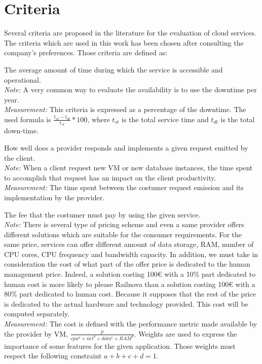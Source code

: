 \documentclass[a4paper,11pt]{article}
\begin{document}
\section{Criteria}
Several criteria are proposed in the literature for the evaluation of cloud services. The criteria which are used in this work has been chosen after consulting the company's preferences.
Those criteria are defined as:
\begin{description}[parsep=1pt,listparindent=\parindent,labelindent=\parindent,font=$\bullet$\ ]
  \item[Availability:] The average amount of time during which the service is accessible and operational.\\
    \emph{Note:} A very common way to evaluate the availability is to use the downtime per year.\\
    \emph{Measurement:} This criteria is expressed as a percentage of the downtime. The used formula is $\frac{t_{st}-t_{dt}}{t_{st}}*100$, where $t_{st}$ is the total service time and $t_{dt}$ is the total down-time.

  \item[Service efficiency:] How well does a provider responds and implements a given request emitted by the client.\\
    \emph{Note:} When a client request new VM or new database instances, the time spent to accomplish that request has an impact on the client productivity.\\
    \emph{Measurement:} The time spent between the costumer request emission and its implementation by the provider.

  \item[Cost:] The fee that the costumer must pay by using the given service.\\
    \emph{Note:} There is several type of pricing scheme and even a same provider offers different solutions which are suitable for the consumer requirements. For the same price, services can offer different amount of data storage, RAM, number of CPU cores, CPU frequency and bandwidth capacity. In addition, we must take in consideration the cost of what part of the offer price is dedicated to the human management price. Indeed, a solution costing 100\euro{} with a 10\% part dedicated to human cost is more likely to please Railnova than a solution costing 100\euro{} with a 80\% part dedicated to human cost. Because it supposes that the rest of the price is dedicated to the actual hardware and technology provided. This cost will be computed separately.\\
    \emph{Measurement:} The cost is defined with the performance metric made available by the provider by VM, $\frac{p}{cpu^a + net^b + data^c + RAM^d}$. Weights are used to express the importance of some features for the given application. Those weights must respect the following constraint $a+b+c+d=1$.


\end{description}
\end{document}
